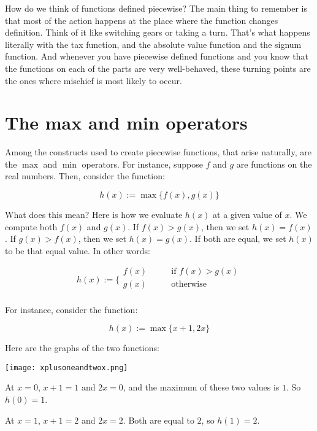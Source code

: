 \documentclass{amsart}
\begin{document}
How do we think of functions defined piecewise? The main thing to
remember is that most of the action happens at the place where the
function changes definition. Think of it like switching gears or
taking a turn. That's what happens literally with the tax function,
and the absolute value function and the signum function. And whenever
you have piecewise defined functions and you know that the functions
on each of the parts are very well-behaved, these turning points are
the ones where mischief is most likely to occur.

\section{The max and min operators}

Among the constructs used to create piecewise functions, that arise
naturally, are the $\max$ and $\min$ operators. For instance, suppose
$f$ and $g$ are functions on the real numbers. Then, consider the
function:

\begin{equation*}
  h(x) := \max\{f(x), g(x) \}
\end{equation*}

What does this mean? Here is how we evaluate $h(x)$ at a given value
of $x$. We compute both $f(x)$ and $g(x)$. If $f(x) > g(x)$, then we
set $h(x) = f(x)$. If $g(x) > f(x)$, then we set $h(x) = g(x)$. If
both are equal, we set $h(x)$ to be that equal value. In other words:

\begin{equation*}
  h(x) := \lbrace\begin{array}{lr}f(x) & \qquad \text{if } f(x) > g(x) \\ g(x) & \qquad \text{otherwise} \\\end{array}
\end{equation*}

For instance, consider the function:

\begin{equation*}
  h(x) := \max \{ x + 1, 2x \}
\end{equation*}

Here are the graphs of the two functions:

\texttt{[image: xplusoneandtwox.png]}

At $x = 0$, $x + 1 = 1$ and $2x = 0$, and the maximum of these two
values is $1$. So $h(0) = 1$.

At $x = 1$, $x + 1 = 2$ and $2x = 2$. Both are equal to $2$, so $h(1)
= 2$.
\end{document}
